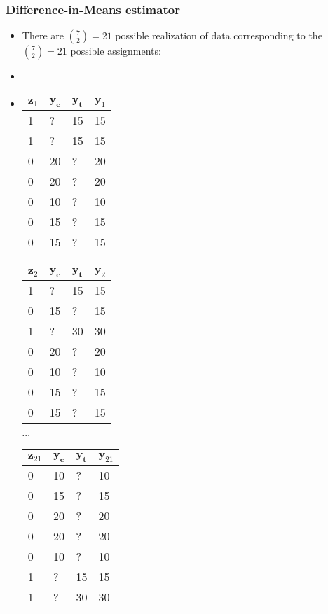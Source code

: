 \documentclass[table, xcolor={dvipsnames}, 9pt]{beamer}
\theoremstyle{newstyle}
\begin{document}
\begin{frame}
\frametitle{Difference-in-Means estimator} 
\begin{itemize}
 \item There are $\binom{7}{2} = 21$ possible realization of data corresponding to the $\binom{7}{2} = 21$ possible assignments:
 \item[]
 \item[]
\begin{table}[H]
\scriptsize
    \begin{tabular}{l|l|l|l|}
    $\mathbf{z}_1$ & $\mathbf{y_c}$ & $\mathbf{y_t}$ & $\mathbf{y}_1$ \\ \midrule
    1 & ?  & 15  & 15 \\
    1 & ?  & 15  & 15 \\
    0 & 20 & ?   & 20 \\
    0 & 20 & ?   & 20 \\
    0 & 10 & ?   & 10 \\
    0 & 15 & ?   & 15 \\
    0 & 15 & ?   & 15 \\
    \end{tabular}
    \hfill
      \begin{tabular}{l|l|l|l|}
    $\mathbf{z}_2$ & $\mathbf{y_c}$ & $\mathbf{y_t}$ & $\mathbf{y}_2$ \\ \midrule
    1 &  ? & 15 & 15 \\
    0 & 15 & ?  & 15 \\
    1 & ?  & 30 & 30 \\
    0 & 20 & ?  & 20 \\
    0 & 10 & ?  & 10 \\
    0 & 15 & ?  & 15 \\
    0 & 15 & ?  & 15 \\
    \end{tabular}
     \hfill
     $\cdots $
     \hfill
      \begin{tabular}{l|l|l|l|}
    $\mathbf{z}_{21}$ & $\mathbf{y_c}$ & $\mathbf{y_t}$ & $\mathbf{y}_{21}$ \\ \midrule
    0 & 10 & ?  & 10 \\
    0 & 15 & ?  & 15 \\
    0 & 20 & ?  & 20 \\
    0 & 20 & ?  & 20 \\
    0 & 10 & ?  & 10 \\
    1 & ?  & 15 & 15 \\
    1 & ?  & 30 & 30 \\
    \end{tabular}

\end{table}
\end{itemize}
\end{frame}
\end{document}
